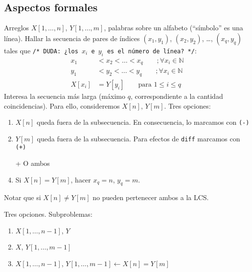\documentclass[english, spanish, fleqn, 10pt]{article}
\newcommand{\comillas}[1]{``#1''}
\newcommand{\comentarioc}[1]{\texttt{\textcolor{webred}{/* #1 */}}}
\numberwithin{equation}{section}
\newcommand{\nparentesis}[1]{\left( #1 \right)}
\newcommand{\ncorchetes}[1]{\left[ #1 \right]}
\theoremstyle{definition}
\begin{document}
\subsection{Aspectos formales}
Arreglos $X\ncorchetes{1, \ldots, n}$, $Y\ncorchetes{1, \ldots, m}$, palabras sobre un alfabeto (\comillas{símbolo} es una línea). Hallar la secuencia de pares de índices $\nparentesis{x_1, y_1}$, $\nparentesis{x_2, y_2}$, \ldots, $\nparentesis{x_q, y_q}$ tales que \comentarioc{DUDA: ¿los $x_i$ e $y_i$ es el número de línea?}:
\begin{align*}
x_1&<x_2<\ldots <x_q\qquad ;\forall x_i\in\mathbb{N}\\
y_1&<y_2<\ldots <y_q\qquad ;\forall x_i\in\mathbb{N}\\
X\ncorchetes{x_i}&=Y\ncorchetes{y_i}\qquad\text{para } 1\leq i\leq q
\end{align*}
Interesa la secuencia más larga (máximo $q$, correspondiente a la cantidad coincidencias). Para ello, consideremos $X\ncorchetes{n}$, $Y\ncorchetes{m}$. Tres opciones:
\begin{enumerate}
	\item $X\ncorchetes{n}$ queda fuera de la subsecuencia. En consecuencia, lo marcamos con \texttt{(-)}
	\item $Y\ncorchetes{m}$ queda fuera de la subsecuencia. Para efectos de \texttt{diff} marcamos con \texttt{(+)}
	\item [+] O ambos
	\item Si $X\ncorchetes{n}=Y\ncorchetes{m}$, hacer $x_q=n$, $y_q=m$.
\end{enumerate}
Notar que si $X\ncorchetes{n}\ne Y\ncorchetes{m}$ no pueden pertenecer ambos a la LCS.

Tres opciones. Subproblemas:
\begin{enumerate}
	\item $X\ncorchetes{1, \ldots, n-1}$, $Y$
	\item $X$, $Y\ncorchetes{1, \ldots, m-1}$
	\item $X\ncorchetes{1, \ldots, n-1}$, $Y\ncorchetes{1, \ldots, m-1}\leftarrow X\ncorchetes{n}=Y\ncorchetes{m}$
\end{enumerate}
\end{document}
